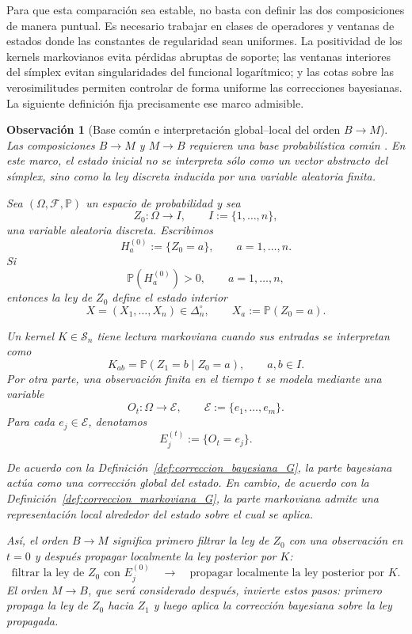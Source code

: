 ﻿\documentclass[12pt]{article}
\newtheorem{observacion}{Observación}[section]
\begin{document}
Para que esta comparación sea estable, no basta con definir las dos composiciones de manera puntual. Es necesario trabajar en clases de operadores y ventanas de estados donde las constantes de regularidad sean uniformes. La positividad de los kernels markovianos evita pérdidas abruptas de soporte; las ventanas interiores del símplex evitan singularidades del funcional logarítmico; y las cotas sobre las verosimilitudes permiten controlar de forma uniforme las correcciones bayesianas. La siguiente definición fija precisamente ese marco admisible.





\begin{observacion}[Base común e interpretación global--local del orden \(B\to M\)]
\label{obs:base_comun_global_local_BM}
Las composiciones \(B\to M\) y \(M\to B\) requieren una base probabilística común \citep{Norris1997,Sprungk2020}. En este marco, el estado inicial no se interpreta sólo como un vector abstracto del símplex, sino como la ley discreta inducida por una variable aleatoria finita.

Sea \((\Omega,\mathcal F,\mathbb P)\) un espacio de probabilidad y sea
\[
Z_0:\Omega\longrightarrow I,
\qquad
I:=\{1,\dots,n\},
\]
una variable aleatoria discreta. Escribimos
\[
H_a^{(0)}:=\{Z_0=a\},
\qquad a=1,\dots,n.
\]
Si
\[
\mathbb P(H_a^{(0)})>0,
\qquad a=1,\dots,n,
\]
entonces la ley de \(Z_0\) define el estado interior
\[
X=(X_1,\dots,X_n)\in\Delta_n^\circ,
\qquad
X_a:=\mathbb P(Z_0=a).
\]

Un kernel \(K\in\mathcal S_n\) tiene lectura markoviana cuando sus entradas se interpretan como
\[
K_{ab}
=
\mathbb P(Z_1=b\mid Z_0=a),
\qquad a,b\in I.
\]
Por otra parte, una observación finita en el tiempo \(t\) se modela mediante una variable
\[
O_t:\Omega\longrightarrow \mathcal E,
\qquad
\mathcal E:=\{e_1,\dots,e_m\}.
\]
Para cada \(e_j\in\mathcal E\), denotamos
\[
E_j^{(t)}:=\{O_t=e_j\}.
\]

De acuerdo con la Definición~\ref{def:correccion_bayesiana_G}, la parte bayesiana actúa como una corrección global del estado. En cambio, de acuerdo con la Definición~\ref{def:correccion_markoviana_G}, la parte markoviana admite una representación local alrededor del estado sobre el cual se aplica.

Así, el orden \(B\to M\) significa primero filtrar la ley de \(Z_0\) con una observación en \(t=0\) y después propagar localmente la ley posterior por \(K\):
\[
\text{filtrar la ley de }Z_0\text{ con }E_j^{(0)}
\quad\longrightarrow\quad
\text{propagar localmente la ley posterior por }K.
\]
El orden \(M\to B\), que será considerado después, invierte estos pasos: primero propaga la ley de \(Z_0\) hacia \(Z_1\) y luego aplica la corrección bayesiana sobre la ley propagada.
\end{observacion}
\end{document}
